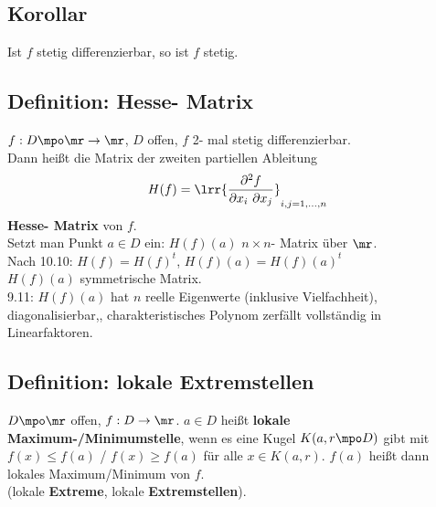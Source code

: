 \subsection{Korollar}
	Ist $f$ stetig differenzierbar, so ist $f$ stetig.

\subsection{Definition: Hesse- Matrix}
	$ f: D\mpo\mr\rightarrow\mr $, $ D $ offen, $ f $ 2- mal stetig differenzierbar.\\
	Dann heißt die Matrix der zweiten partiellen Ableitung
	\[ H(f)=\lrr{\dfrac{\partial^2 f}{\partial x_i\ \partial x_j}}_{i,j=1,...,n} \]
	\textbf{Hesse- Matrix} von $ f $.\\
	Setzt man Punkt $ a\in D $ ein: $ H(f)(a) $ $ n\times n $- Matrix über $ \mr $.\\
	Nach 10.10: $ H(f)=H(f)^t $, $ H(f)(a)=H(f)(a)^t $\\
	$ H(f)(a) $ symmetrische Matrix.\\
	9.11: $ H(f)(a) $ hat $ n $ reelle Eigenwerte (inklusive Vielfachheit), diagonalisierbar,, charakteristisches Polynom zerfällt vollständig in Linearfaktoren.
	
\subsection{Definition: lokale Extremstellen}
	$ D\mpo\mr $ offen, $ f:D\rightarrow\mr $. $ a\in D $ heißt \textbf{lokale Maximum-/Minimumstelle}, wenn es eine Kugel $ K(a,r\mpo D) $ gibt mit $ f(x)\leq f(a) $ / $ f(x)\geq f(a) $ für alle $ x\in K(a,r) $. $ f(a) $ heißt dann lokales Maximum/Minimum von $ f $.\\
	(lokale \textbf{Extreme}, lokale \textbf{Extremstellen}).
	
